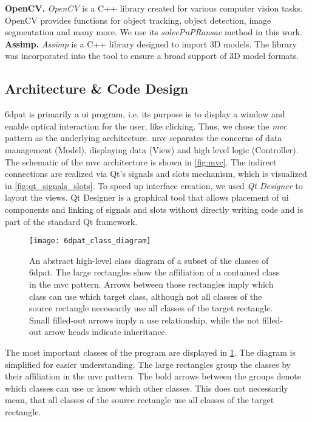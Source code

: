 \noindent\textbf{OpenCV.} \textit{OpenCV} \cite{opencv} is a C++ library created for various computer vision tasks. OpenCV provides functions for object tracking, object detection, image segmentation and many more. We use its \textit{solvePnPRansac} method in this work. \\ 

\noindent\textbf{Assimp.} \textit{Assimp} \cite{assimp} is a C++ library designed to import 3D models. The library was incorporated into the tool to ensure a broad support of 3D model formats.

\subsection{Architecture \& Code Design}

\ac{6dpat} is primarily a \ac{ui} program, i.e. its purpose is to display a window and enable optical interaction for the user, like clicking. Thus, we chose the \textit{\ac{mvc}} pattern as the underlying architecture. \ac{mvc} separates the concerns of data management (Model), displaying data (View) and high level logic (Controller). The schematic of the \ac{mvc} architecture is shown in \fig \ref{fig:mvc}. The indirect connections are realized via Qt's signals and slots mechanism, which is visualized in \fig \ref{fig:qt_signals_slots}. To speed up interface creation, we used \textit{Qt Designer} to layout the views. Qt Designer is a graphical tool that allows placement of \ac{ui} components and linking of signals and slots without directly writing code and is part of the standard Qt framework.

\begin{figure}[!tbp]
       \centering
   \texttt{[image: 6dpat\_class\_diagram]}
    \caption{An abstract high-level class diagram of a subset of the classes of \ac{6dpat}. The large rectangles show the affiliation of a contained class in the \ac{mvc} pattern. Arrows between those rectangles imply which class can use which target class, although not all classes of the source rectangle necessarily use all classes of the target rectangle. Small filled-out arrows imply a use relationship, while the not filled-out arrow heads indicate inheritance.}
   \label{fig:6dpat_class_diagram}
\end{figure}

The most important classes of the program are displayed in \fig \ref{fig:6dpat_class_diagram}. The diagram is simplified for easier understanding. The large rectangles group the classes by their affiliation in the \ac{mvc} pattern. The bold arrows between the groups denote which classes can use or know which other classes. This does not necessarily mean, that all classes of the source rectangle use all classes of the target rectangle. 


